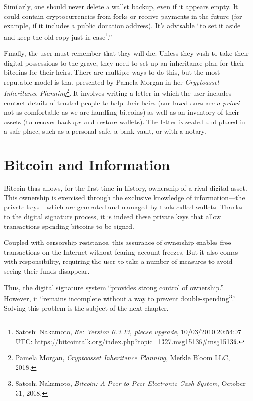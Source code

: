 \documentclass[
  a5paper,
  smalldemyvopaper,10pt,twoside,onecolumn,openright,extrafontsizes,hidelinks]{memoir}
\begin{document}
Similarly, one should never delete a wallet backup, even if it appears
empty. It could contain cryptocurrencies from forks or receive payments
in the future (for example, if it includes a public donation address).
It's advisable ``to set it aside and keep the old copy just in
case\footnote{Satoshi Nakamoto, \emph{Re: Version 0.3.13, please
  upgrade}, 10/03/2010 20:54:07 UTC:
  \url{https://bitcointalk.org/index.php?topic=1327.msg15136\#msg15136}.}.''

Finally, the user must remember that they will die. Unless they wish to
take their digital possessions to the grave, they need to set up an
inheritance plan for their bitcoins for their heirs. There are multiple
ways to do this, but the most reputable model is that presented by
Pamela Morgan in her \emph{Cryptoasset Inheritance Planning}\footnote{Pamela
  Morgan, \emph{Cryptoasset Inheritance Planning}, Merkle Bloom LLC,
  2018.}. It involves writing a letter in which the user includes
contact details of trusted people to help their heirs (our loved ones
are \emph{a priori} not as comfortable as we are handling bitcoins) as
well as an inventory of their assets (to recover backups and restore
wallets). The letter is sealed and placed in a safe place, such as a
personal safe, a bank vault, or with a notary.

\section*{Bitcoin and Information}\label{bitcoin-and-information}


Bitcoin thus allows, for the first time in history, ownership of a rival
digital asset. This ownership is exercised through the exclusive
knowledge of information---the private keys---which are generated and
managed by tools called wallets. Thanks to the digital signature
process, it is indeed these private keys that allow transactions
spending bitcoins to be signed.

Coupled with censorship resistance, this assurance of ownership enables
free transactions on the Internet without fearing account freezes. But
it also comes with responsibility, requiring the user to take a number
of measures to avoid seeing their funds disappear.

Thus, the digital signature system ``provides strong control of
ownership.'' However, it ``remains incomplete without a way to prevent
double-spending\footnote{Satoshi Nakamoto, \emph{Bitcoin: A Peer-to-Peer
  Electronic Cash System}, October 31, 2008.}.'' Solving this problem is
the subject of the next chapter.
\end{document}
